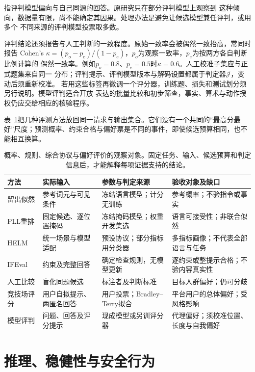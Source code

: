 \emph{}指评判模型偏向与自己同源的回答。原研究只在部分评判模型上观察到
这种倾向，数据量有限，尚不能确定其因果。处理办法是避免让候选模型兼任评判，或用多个
不同来源的评判模型投票取多数。

评判结论还须报告与人工判断的一致程度。原始一致率会被偶然一致抬高，常同时报告
Cohen's $\kappa=(p_o-p_e)/(1-p_e)$，$p_o$为观察一致率，$p_e$为按两方各自判断比例计算的
偶然一致率。例如$p_o=0.8$、$p_e=0.5$时$\kappa=0.6$。人工校准子集应与正式题集来自同一
分布；评判提示、评判模型版本与解码设置都属于判定器$\mathcal J$，变动后须重新校准。
若用这些标签再微调一个评分器，训练题、损失和测试划分须另行说明。模型评判适合开放
表达的批量比较和初步筛查，事实、算术与动作授权仍应交给相应的核验程序。

表~\ref{tab:nlp-eval-observation-contracts}把几种评测方法放回同一请求与输出集合。它们没有一个共同的“最高分最好”尺度；预测概率、约束合格与偏好票是不同的事件，即使候选预算相同，也不能相互换算。

\begin{table}[htbp]
 \begin{tabularx}{\linewidth}{@{}p{25mm}p{34mm}p{39mm}X@{}}
  \toprule
  方法 & 实际输入 & 参数与判定来源 & 验收对象及缺口\\
  \midrule
  留出似然 & 参考词元与可见条件 & 冻结语言模型；计分无训练 & 参考概率；不验指令或事实\\
  PLL重排 & 固定候选、逐位置掩码 & 冻结掩码模型；权重开发集选 & 语言可接受性；非联合似然\\
  HELM & 统一场景与模型适配 & 预设协议；部分指标用分类器 & 多指标画像；不代表全部语言与任务\\
  IFEval & 约束及完整回答 & 确定检查规则，无模型更新 & 逐约束或整提示合格；不验内容真实性\\
  人工比较 & 盲化同题候选 & 标注者及判断标准 & 目标人群偏好；仍可分歧\\
  竞技场评分 & 用户自拟提示、两匿名回答 & 用户投票；Bradley--Terry拟合 & 平台用户的总体偏好；受风格影响\\
  模型评判 & 问题、回答及评分提示 & 现成模型或另训评分器 & 代理偏好；须校准位置、长度与自我偏好\\
  \bottomrule
 \end{tabularx}
 \caption{概率、规则、综合协议与偏好评价的观察对象。固定任务、输入、候选预算和判定信息后，才能解释每项证据支持的结论。}
 \label{tab:nlp-eval-observation-contracts}
\end{table}

\section{推理、稳健性与安全行为}
\label{sec:nlp-eval-reasoning-safety}

